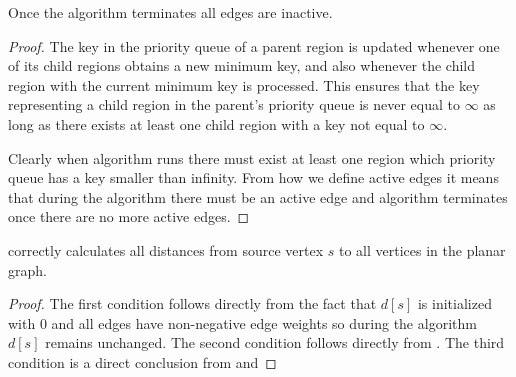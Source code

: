 \begin{lemma}
\label{all}
Once the algorithm terminates all edges are inactive.
\end{lemma}
\begin{proof}
The key in the priority queue of a parent region is updated whenever one of its child regions obtains a new minimum key, and also whenever the child region with the current minimum key is processed. This ensures that the key representing a child region in the parent’s priority queue is never equal to $\infty$ as long as there exists at least one child region with a key not equal to $\infty$.

Clearly when algorithm runs there must exist at least one region which priority queue has a key smaller than infinity. From how we define active edges it means that during the algorithm there must be an active edge and algorithm terminates once there are no more active edges.
\end{proof}

\begin{theorem}
 correctly calculates all distances from source vertex $s$ to all vertices in the planar graph.
\end{theorem}

\begin{proof}
The first condition follows directly from the fact that $d[s]$ is initialized with $0$ and all edges have non-negative edge weights so during the algorithm $d[s]$ remains unchanged. The second condition follows directly from  . The third condition is a direct conclusion from   and 
\end{proof}
